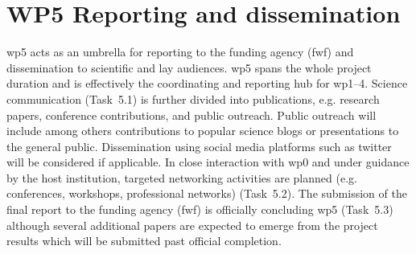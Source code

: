 \section{WP5 Reporting and dissemination}
\label{sec:wp5}
\gls{wp}5 acts as an umbrella for reporting to the funding agency (\gls{fwf}) and dissemination to scientific and lay audiences. \gls{wp}5 spans the whole project duration and is effectively the coordinating and reporting hub for \gls{wp}1--4. Science communication (Task~5.1) is further divided into publications, e.g. research papers, conference contributions, and public outreach. Public outreach will include among others contributions to popular science blogs or presentations to the general public. Dissemination using social media platforms such as twitter will be considered if applicable. In close interaction with \gls{wp}0 and under guidance by the host institution, targeted networking activities are planned (e.g. conferences, workshops, professional networks) (Task~5.2). The submission of the final report to the funding agency (\gls{fwf}) is officially concluding \gls{wp}5 (Task~5.3) although several additional papers are expected to emerge from the project results which will be submitted past official completion.
